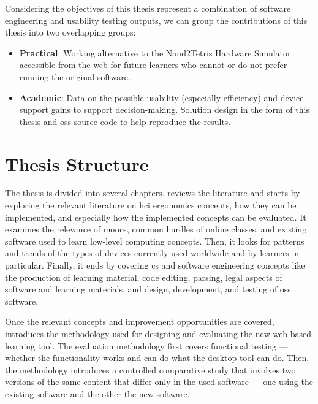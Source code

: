Considering the objectives of this thesis represent a combination of software engineering and usability testing outputs, we can group the contributions of this thesis into two overlapping groups:

\begin{itemize}
    \item \textbf{Practical}: Working alternative to the Nand2Tetris Hardware Simulator accessible from the web for future learners who cannot or do not prefer running the original software.
    \item \textbf{Academic}: Data on the possible usability (especially efficiency) and device support gains to support decision-making. Solution design in the form of this thesis and \gls{oss} source code to help reproduce the results.
\end{itemize}

\section{Thesis Structure}

The thesis is divided into several chapters.
 reviews the literature and starts by exploring the relevant literature on \gls{hci} ergonomics concepts, how they can be implemented, and especially how the implemented concepts can be evaluated.
It examines the relevance of \glspl{mooc}, common hurdles of online classes, and existing software used to learn low-level computing concepts.
Then, it looks for patterns and trends of the types of devices currently used worldwide and by learners in particular.
Finally, it ends by covering \gls{cs} and software engineering concepts like the production of learning material, code editing, parsing, legal aspects of software and learning materials, and design, development, and testing of \gls{oss} software.

Once the relevant concepts and improvement opportunities are covered,  introduces the methodology used for designing and evaluating the new web-based learning tool.
The evaluation methodology first covers functional testing --- whether the functionality works and can do what the desktop tool can do.
Then, the methodology introduces a controlled comparative study that involves two versions of the same content that differ only in the used software --- one using the existing software and the other the new software.


